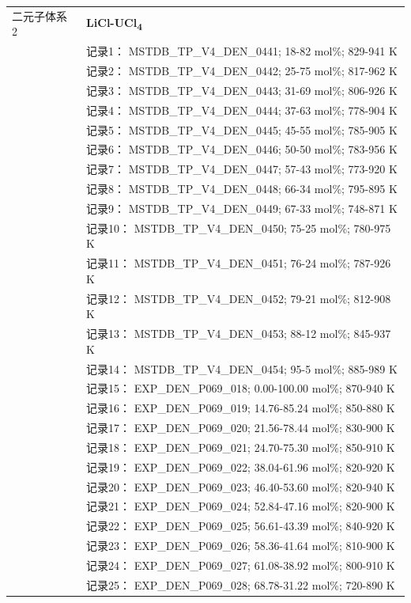 \documentclass[12pt]{article}
\begin{document}
{\begin{longtable}[]{@{}
  >{\raggedright\arraybackslash}p{}
  >{\raggedright\arraybackslash}p{}@{}}
二元子体系 2  & \textbf{LiCl-UCl\textsubscript{4}} \\
 & 记录1： MSTDB\_TP\_V4\_DEN\_0441; 18-82 mol\%; 829-941 K \\
 & 记录2： MSTDB\_TP\_V4\_DEN\_0442; 25-75 mol\%; 817-962 K \\
 & 记录3： MSTDB\_TP\_V4\_DEN\_0443; 31-69 mol\%; 806-926 K \\
 & 记录4： MSTDB\_TP\_V4\_DEN\_0444; 37-63 mol\%; 778-904 K \\
 & 记录5： MSTDB\_TP\_V4\_DEN\_0445; 45-55 mol\%; 785-905 K \\
 & 记录6： MSTDB\_TP\_V4\_DEN\_0446; 50-50 mol\%; 783-956 K \\
 & 记录7： MSTDB\_TP\_V4\_DEN\_0447; 57-43 mol\%; 773-920 K \\
 & 记录8： MSTDB\_TP\_V4\_DEN\_0448; 66-34 mol\%; 795-895 K \\
 & 记录9： MSTDB\_TP\_V4\_DEN\_0449; 67-33 mol\%; 748-871 K \\
 & 记录10： MSTDB\_TP\_V4\_DEN\_0450; 75-25 mol\%; 780-975 K \\
 & 记录11： MSTDB\_TP\_V4\_DEN\_0451; 76-24 mol\%; 787-926 K \\
 & 记录12： MSTDB\_TP\_V4\_DEN\_0452; 79-21 mol\%; 812-908 K \\
 & 记录13： MSTDB\_TP\_V4\_DEN\_0453; 88-12 mol\%; 845-937 K \\
 & 记录14： MSTDB\_TP\_V4\_DEN\_0454; 95-5 mol\%; 885-989 K \\
 & 记录15： EXP\_DEN\_P069\_018; 0.00-100.00 mol\%; 870-940 K \\
 & 记录16： EXP\_DEN\_P069\_019; 14.76-85.24 mol\%; 850-880 K \\
 & 记录17： EXP\_DEN\_P069\_020; 21.56-78.44 mol\%; 830-900 K \\
 & 记录18： EXP\_DEN\_P069\_021; 24.70-75.30 mol\%; 850-910 K \\
 & 记录19： EXP\_DEN\_P069\_022; 38.04-61.96 mol\%; 820-920 K \\
 & 记录20： EXP\_DEN\_P069\_023; 46.40-53.60 mol\%; 820-940 K \\
 & 记录21： EXP\_DEN\_P069\_024; 52.84-47.16 mol\%; 820-900 K \\
 & 记录22： EXP\_DEN\_P069\_025; 56.61-43.39 mol\%; 840-920 K \\
 & 记录23： EXP\_DEN\_P069\_026; 58.36-41.64 mol\%; 810-900 K \\
 & 记录24： EXP\_DEN\_P069\_027; 61.08-38.92 mol\%; 800-910 K \\
 & 记录25： EXP\_DEN\_P069\_028; 68.78-31.22 mol\%; 720-890 K \\

\end{longtable}}
\end{document}
